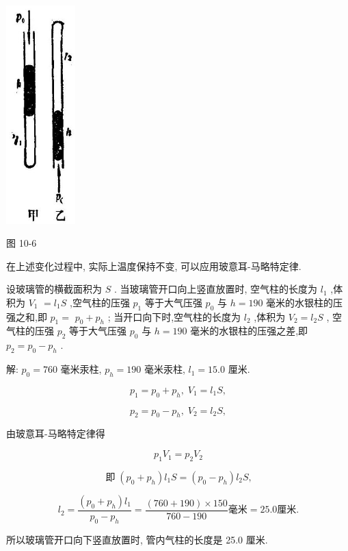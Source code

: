 \documentclass[10pt]{article}
\begin{document}
\begin{center}
\includegraphics[max width=0.2\textwidth]{images/01912d55-147c-70aa-b0e0-1782a122f948_286_701519.jpg}
\end{center}

图 10-6

在上述变化过程中, 实际上温度保持不变, 可以应用玻意耳-马略特定律.

设玻璃管的横截面积为 \(S\) . 当玻璃管开口向上竖直放置时, 空气柱的长度为 \({l}_{1}\) ,体积为 \({V}_{1}\) \(= {l}_{1}S\) ,空气柱的压强 \({p}_{1}\) 等于大气压强 \({p}_{0}\) 与 \(h = {190}\) 毫米的水银柱的压强之和,即 \({p}_{1} =\) \({p}_{0} + {p}_{h}\) ; 当开口向下时,空气柱的长度为 \({l}_{2}\) ,体积为 \({V}_{2} = {l}_{2}S\) , 空气柱的压强 \({p}_{2}\) 等于大气压强 \({p}_{0}\) 与 \(h = {190}\) 毫米的水银柱的压强之差,即 \({p}_{2} = {p}_{0} - {p}_{h}\) .

解: \({p}_{0} = {760}\) 毫米汞柱, \({p}_{h} = {190}\) 毫米汞柱, \({l}_{1} = {15.0}\) 厘米.

\[
{p}_{1} = {p}_{0} + {p}_{h},\;{V}_{1} = {l}_{1}S,
\]

\[
{p}_{2} = {p}_{0} - {p}_{h},\;{V}_{2} = {l}_{2}S,
\]

由玻意耳-马略特定律得

\[
{p}_{1}{V}_{1} = {p}_{2}{V}_{2}
\]

\[
\text{即}\;\left( {{p}_{0} + {p}_{h}}\right) {l}_{1}S = \left( {{p}_{0} - {p}_{h}}\right) {l}_{2}S\text{,}
\]

\[
{l}_{2} = \frac{\left( {{p}_{0} + {p}_{h}}\right) {l}_{1}}{{p}_{0} - {p}_{h}} = \frac{\left( {{760} + {190}}\right) \times {150}}{{760} - {190}}\text{毫米} = {25.0}\text{厘米.}
\]

所以玻璃管开口向下竖直放置时, 管内气柱的长度是 25.0 厘米.
\end{document}
